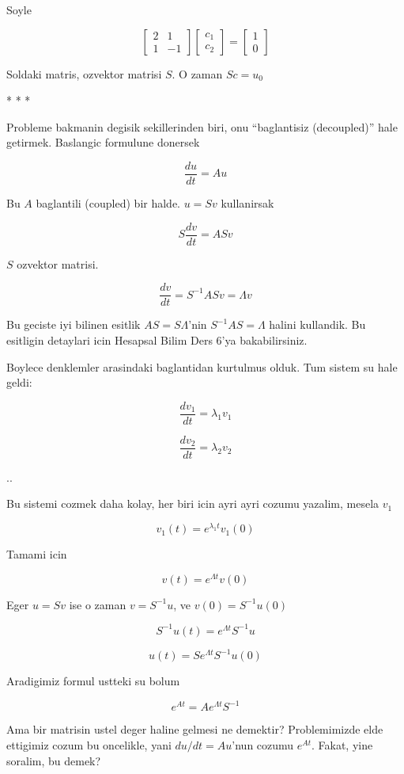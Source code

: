 \documentclass[12pt,fleqn]{article}\usepackage{../common}
\begin{document}
Soyle

\[ 
\left[\begin{array}{cc}
2 & 1 \\ 1 & -1
\end{array}\right]
\left[\begin{array}{c}
c_1 \\ c_2
\end{array}\right] 
=
\left[\begin{array}{c}
1 \\ 0
\end{array}\right] 
 \]

Soldaki matris, ozvektor matrisi $S$. O zaman $Sc = u_0$ 

* * *

Probleme bakmanin degisik sekillerinden biri, onu ``baglantisiz
(decoupled)'' hale getirmek. Baslangic formulune donersek

\[ \frac{du}{dt} = Au \]

Bu $A$ baglantili (coupled) bir halde. $u = Sv$ kullanirsak

\[ S\frac{dv}{dt} = ASv\]

$S$ ozvektor matrisi. 

\[ \frac{dv}{dt} = S^{-1}ASv = \Lambda v\]

Bu geciste iyi bilinen esitlik $AS=S\Lambda$'nin $S^{-1}AS = \Lambda$
halini kullandik. Bu esitligin detaylari icin Hesapsal Bilim Ders 6'ya
bakabilirsiniz.

Boylece denklemler arasindaki baglantidan kurtulmus olduk. Tum sistem su
hale geldi:

\[ \frac{dv_1}{dt} = \lambda_1 v_1\]

\[ \frac{dv_2}{dt} = \lambda_2 v_2\]

..

Bu sistemi cozmek daha kolay, her biri icin ayri ayri cozumu yazalim,
mesela $v_1$

\[ v_1(t) = e^{\lambda_1 t} v_1(0) \]

Tamami icin

\[ v(t) = e^{\Lambda t} v(0) \]

Eger $u=Sv$ ise o zaman $v=S^{-1}u$, ve $v(0)=S^{-1}u(0)$

\[ S^{-1}u(t) = e^{\Lambda t} S^{-1}u \]

\[ u(t) = Se^{\Lambda t}S^{-1} u(0) \]

Aradigimiz formul ustteki su bolum

\[ e^{At} = Ae^{\Lambda t} S^{-1} \]

Ama bir matrisin ustel deger haline gelmesi ne demektir? Problemimizde elde
ettigimiz cozum bu oncelikle, yani $du/dt = Au$'nun cozumu $e^{At}$. Fakat,
yine soralim, bu demek? 
\end{document}
